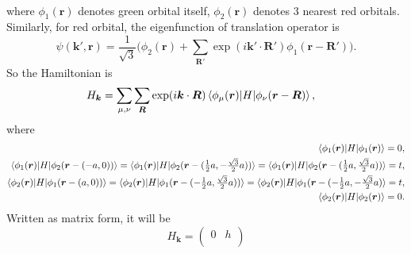 \documentclass[12pt]{article}
\begin{document}
\begin{enumerate}[(a)]
\begin{equation}
\begin{split}
              \end{split}
          \end{equation}
          where $\phi_1(\bm{r})$ denotes green orbital itself, $\phi_2(\bm{r})$
          denotes $3$ nearest red orbitals.
          Similarly, for red orbital, the eigenfunction
          of translation operator is
          \begin{equation}
              \psi(\bm{k}', \bm{r})
              = \frac{1}{\sqrt{3}} \Big(\phi_{2}(\bm{r}) + \sum_{\bm{R}'} \exp(i\bm{k}'
              \cdot \bm{R}') \phi_{1}(\bm{r}-\bm{R}')\Big).
          \end{equation}
          So the Hamiltonian is
          \begin{equation}
              \begin{split}
                  H_{\bm{k}}
                   & = \sum_{\mu,\nu}\sum_{\bm{R}} \exp(i\bm{k}\cdot\bm{R})
                  \braket{\phi_\mu(\bm{r}) | H | \phi_\nu(\bm{r} - \bm{R})},
              \end{split}
          \end{equation}
          where
          \begin{equation}
              \begin{split}
                  \braket{\phi_1(\bm{r}) | H | \phi_1(\bm{r})}              = 0,                             \\
                  \braket{\phi_1(\bm{r}) | H | \phi_2(\bm{r}- (-a, 0))} =
                  \braket{\phi_1(\bm{r}) | H | \phi_2(\bm{r} - (\tfrac{1}{2}a, -\tfrac{\sqrt{3}}{2}a))} =
                  \braket{\phi_1(\bm{r}) | H | \phi_2(\bm{r} - (\tfrac{1}{2}a, \tfrac{\sqrt{3}}{2}a))} = t,  \\
                  \braket{\phi_2(\bm{r}) | H | \phi_1(\bm{r} - (a, 0))} =
                  \braket{\phi_2(\bm{r}) | H | \phi_1(\bm{r} - (-\tfrac{1}{2}a, \tfrac{\sqrt{3}}{2}a))} =
                  \braket{\phi_2(\bm{r}) | H | \phi_1(\bm{r} - (-\tfrac{1}{2}a, -\tfrac{\sqrt{3}}{2}a)} = t, \\
                  \braket{\phi_2(\bm{r}) | H | \phi_2(\bm{r})}              = 0.
              \end{split}
          \end{equation}
          Written as matrix form, it will be
          \begin{equation}
              H_{\bm{k}} =
              \begin{pmatrix}
                  0      & h \\

\end{pmatrix}
\end{equation}
\end{enumerate}
\end{document}
